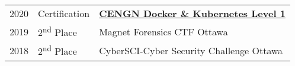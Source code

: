\documentclass[letterpaper]{deedy-resume} %
\begin{document}
\begin{minipage}[t]{0.66\textwidth}
\begin{tabular}{rll}
2020	 & Certification & \href{https://www.credly.com/badges/7a6c2383-9563-4d67-9878-a40bee831e53?source=linked_in_profile}{\bf CENGN Docker \& Kubernetes Level 1} \\
2019	 & 2\textsuperscript{nd} Place & Magnet Forensics CTF Ottawa \\
2018	 & 2\textsuperscript{nd} Place & CyberSCI-Cyber Security Challenge Ottawa\\


\end{tabular}


\end{minipage} %








\end{document}
